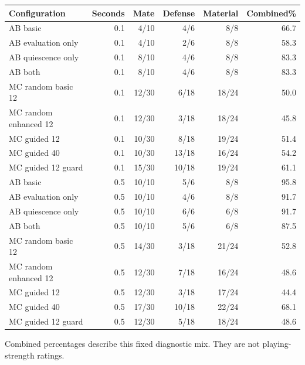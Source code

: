\begin{center}\small\setlength{\tabcolsep}{4pt}
\begin{tabular}{lrrrrr}\toprule
Configuration & Seconds & Mate & Defense & Material & Combined\%\\\midrule
AB basic & 0.1 & 4/10 & 4/6 & 8/8 & 66.7 \\
AB evaluation only & 0.1 & 4/10 & 2/6 & 8/8 & 58.3 \\
AB quiescence only & 0.1 & 8/10 & 4/6 & 8/8 & 83.3 \\
AB both & 0.1 & 8/10 & 4/6 & 8/8 & 83.3 \\
MC random basic 12 & 0.1 & 12/30 & 6/18 & 18/24 & 50.0 \\
MC random enhanced 12 & 0.1 & 12/30 & 3/18 & 18/24 & 45.8 \\
MC guided 12 & 0.1 & 10/30 & 8/18 & 19/24 & 51.4 \\
MC guided 40 & 0.1 & 10/30 & 13/18 & 16/24 & 54.2 \\
MC guided 12 guard & 0.1 & 15/30 & 10/18 & 19/24 & 61.1 \\
AB basic & 0.5 & 10/10 & 5/6 & 8/8 & 95.8 \\
AB evaluation only & 0.5 & 10/10 & 4/6 & 8/8 & 91.7 \\
AB quiescence only & 0.5 & 10/10 & 6/6 & 6/8 & 91.7 \\
AB both & 0.5 & 10/10 & 5/6 & 6/8 & 87.5 \\
MC random basic 12 & 0.5 & 14/30 & 3/18 & 21/24 & 52.8 \\
MC random enhanced 12 & 0.5 & 12/30 & 7/18 & 16/24 & 48.6 \\
MC guided 12 & 0.5 & 12/30 & 3/18 & 17/24 & 44.4 \\
MC guided 40 & 0.5 & 17/30 & 10/18 & 22/24 & 68.1 \\
MC guided 12 guard & 0.5 & 12/30 & 5/18 & 18/24 & 48.6 \\
\bottomrule\end{tabular}\end{center}
Combined percentages describe this fixed diagnostic mix. They are not playing-strength ratings.
